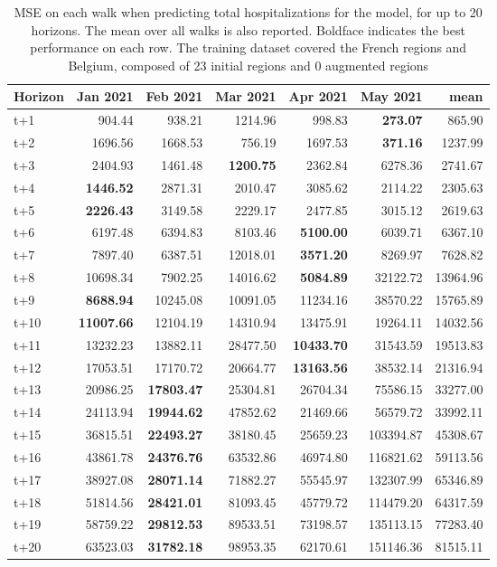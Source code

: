 \begin{table}[H]
\centering
\caption{MSE on each walk when predicting total hospitalizations for the model, for up to 20 horizons. The mean over all walks is also reported. Boldface indicates the best performance on each row. The training dataset covered the French regions and Belgium, composed of 23 initial regions and 0 augmented regions }
\label{tab:MSE_walk_dense_model}
\begin{tabular}{lrrrrrr}
\toprule
Horizon &  Jan 2021 &  Feb 2021 &  Mar 2021 &  Apr 2021 &  May 2021 &     mean \\
\midrule
t+1  & 904.44  & 938.21  & 1214.96  & 998.83  & \textbf{273.07}  & 865.90  \\
t+2  & 1696.56  & 1668.53  & 756.19  & 1697.53  & \textbf{371.16}  & 1237.99  \\
t+3  & 2404.93  & 1461.48  & \textbf{1200.75}  & 2362.84  & 6278.36  & 2741.67  \\
t+4  & \textbf{1446.52}  & 2871.31  & 2010.47  & 3085.62  & 2114.22  & 2305.63  \\
t+5  & \textbf{2226.43}  & 3149.58  & 2229.17  & 2477.85  & 3015.12  & 2619.63  \\
t+6  & 6197.48  & 6394.83  & 8103.46  & \textbf{5100.00}  & 6039.71  & 6367.10  \\
t+7  & 7897.40  & 6387.51  & 12018.01  & \textbf{3571.20}  & 8269.97  & 7628.82  \\
t+8  & 10698.34  & 7902.25  & 14016.62  & \textbf{5084.89}  & 32122.72  & 13964.96  \\
t+9  & \textbf{8688.94}  & 10245.08  & 10091.05  & 11234.16  & 38570.22  & 15765.89  \\
t+10  & \textbf{11007.66}  & 12104.19  & 14310.94  & 13475.91  & 19264.11  & 14032.56  \\
t+11  & 13232.23  & 13882.11  & 28477.50  & \textbf{10433.70}  & 31543.59  & 19513.83  \\
t+12  & 17053.51  & 17170.72  & 20664.77  & \textbf{13163.56}  & 38532.14  & 21316.94  \\
t+13  & 20986.25  & \textbf{17803.47}  & 25304.81  & 26704.34  & 75586.15  & 33277.00  \\
t+14  & 24113.94  & \textbf{19944.62}  & 47852.62  & 21469.66  & 56579.72  & 33992.11  \\
t+15  & 36815.51  & \textbf{22493.27}  & 38180.45  & 25659.23  & 103394.87  & 45308.67  \\
t+16  & 43861.78  & \textbf{24376.76}  & 63532.86  & 46974.80  & 116821.62  & 59113.56  \\
t+17  & 38927.08  & \textbf{28071.14}  & 71882.27  & 55545.97  & 132307.99  & 65346.89  \\
t+18  & 51814.56  & \textbf{28421.01}  & 81093.45  & 45779.72  & 114479.20  & 64317.59  \\
t+19  & 58759.22  & \textbf{29812.53}  & 89533.51  & 73198.57  & 135113.15  & 77283.40  \\
t+20  & 63523.03  & \textbf{31782.18}  & 98953.35  & 62170.61  & 151146.36  & 81515.11  \\

\bottomrule
\end{tabular}
\end{table}
